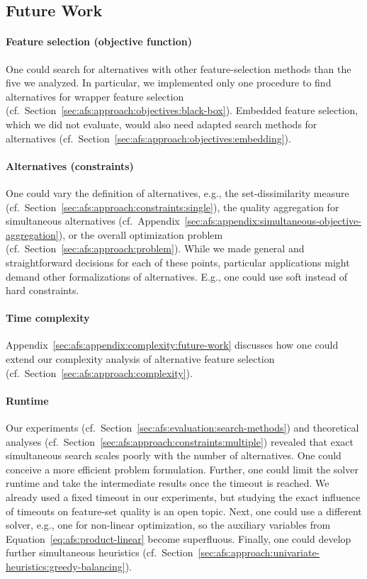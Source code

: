 \documentclass{article}
\theoremstyle{definition}
\begin{document}
\subsection{Future Work}
\label{sec:afs:conclusion:future-work}

\paragraph{Feature selection (objective function)}

One could search for alternatives with other feature-selection methods than the five we analyzed.
In particular, we implemented only one procedure to find alternatives for wrapper feature selection (cf.~Section~\ref{sec:afs:approach:objectives:black-box}).
Embedded feature selection, which we did not evaluate, would also need adapted search methods for alternatives (cf.~Section~\ref{sec:afs:approach:objectives:embedding}).

\paragraph{Alternatives (constraints)}

One could vary the definition of alternatives, e.g., the set-dissimilarity measure (cf.~Section~\ref{sec:afs:approach:constraints:single}), the quality aggregation for simultaneous alternatives (cf.~Appendix~\ref{sec:afs:appendix:simultaneous-objective-aggregation}), or the overall optimization problem (cf.~Section~\ref{sec:afs:approach:problem}).
While we made general and straightforward decisions for each of these points, particular applications might demand other formalizations of alternatives.
E.g., one could use soft instead of hard constraints.

\paragraph{Time complexity}

Appendix~\ref{sec:afs:appendix:complexity:future-work} discusses how one could extend our complexity analysis of alternative feature selection (cf.~Section~\ref{sec:afs:approach:complexity}).

\paragraph{Runtime}

Our experiments (cf.~Section~\ref{sec:afs:evaluation:search-methods}) and theoretical analyses (cf.~Section~\ref{sec:afs:approach:constraints:multiple}) revealed that exact simultaneous search scales poorly with the number of alternatives.
One could conceive a more efficient problem formulation.
Further, one could limit the solver runtime and take the intermediate results once the timeout is reached.
We already used a fixed timeout in our experiments, but studying the exact influence of timeouts on feature-set quality is an open topic.
Next, one could use a different solver, e.g., one for non-linear optimization, so the auxiliary variables from Equation~\ref{eq:afs:product-linear} become superfluous.
Finally, one could develop further simultaneous heuristics (cf.~Section~\ref{sec:afs:approach:univariate-heuristics:greedy-balancing}).
\end{document}
